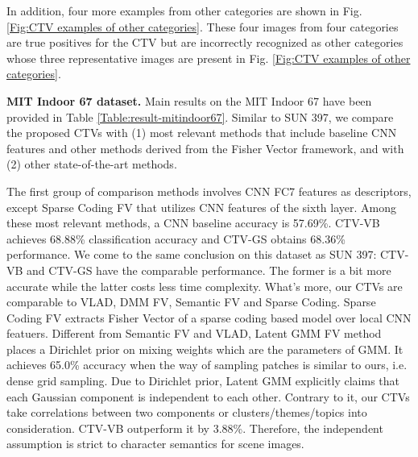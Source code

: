 \documentclass[journal]{IEEEtran}
\begin{document}
In addition, four more examples from other categories are shown in Fig. \ref{Fig:CTV examples of other categories}. These four images from four categories are true positives for the CTV but are incorrectly recognized as other categories whose three representative images are present in Fig. \ref{Fig:CTV examples of other categories}.

\textbf{MIT Indoor 67 dataset.}
Main results on the MIT Indoor 67 have been provided in Table \ref{Table:result-mitindoor67}. Similar to SUN 397, we compare the proposed CTVs with (1) most relevant methods that include baseline CNN features and other methods derived from the Fisher Vector framework, and with (2) other state-of-the-art methods.

The first group of comparison methods involves CNN FC7 features as descriptors, except Sparse Coding FV \cite{liu2014encoding} that utilizes CNN features of the sixth layer.
Among these most relevant methods, a CNN baseline accuracy is 57.69\%. CTV-VB achieves 68.88\% classification accuracy and CTV-GS obtains 68.36\% performance. We come to the same conclusion on this dataset as SUN 397: CTV-VB and CTV-GS have the comparable performance. The former is a bit more accurate while the latter costs less time complexity. What's more, our CTVs are comparable to VLAD, DMM FV, Semantic FV and Sparse Coding. Sparse Coding FV \cite{liu2014encoding} extracts Fisher Vector of a sparse coding based model over local CNN featuers.
Different from Semantic FV and VLAD, Latent GMM FV method \cite{cinbis2015approximate} places a Dirichlet prior on mixing weights which are the parameters of GMM. It achieves 65.0\% accuracy when the way of sampling patches is similar to ours, i.e. dense grid sampling. Due to Dirichlet prior, Latent GMM explicitly claims that each Gaussian component is independent to each other. Contrary to it, our CTVs take correlations between two components or clusters/themes/topics into consideration. CTV-VB outperform it by 3.88\%. Therefore, the independent assumption is strict to character semantics for scene images.
\end{document}
